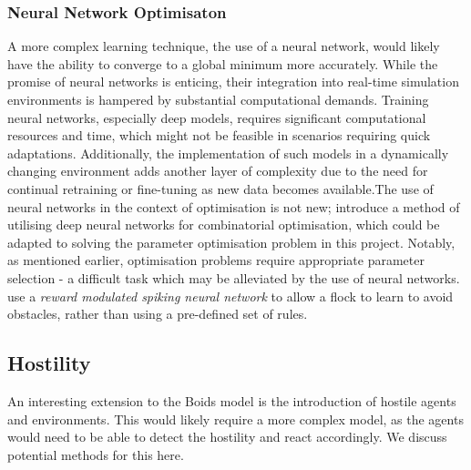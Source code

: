 \documentclass[12pt]{article}
\begin{document}
\subsubsection{Neural Network Optimisaton}
A more complex learning technique, the use of a neural network, would likely have the ability to converge to a global minimum more accurately. While the promise of neural networks is enticing, their integration into real-time simulation environments is hampered by substantial computational demands. Training neural networks, especially deep models, requires significant computational resources and time, which might not be feasible in scenarios requiring quick adaptations. Additionally, the implementation of such models in a dynamically changing environment adds another layer of complexity due to the need for continual retraining or fine-tuning as new data becomes available.The use of neural networks in the context of optimisation is not new; \citet{Caldwell} introduce a method of utilising deep neural networks for combinatorial optimisation, which could be adapted to solving the parameter optimisation problem in this project. Notably, as mentioned earlier, optimisation problems require appropriate parameter selection - a difficult task which may be alleviated by the use of neural networks. \citet{zhao2022nature} use a \emph{reward modulated spiking neural network} to allow a flock to learn to avoid obstacles, rather than using a pre-defined set of rules.

\subsection{Hostility}
An interesting extension to the Boids model is the introduction of hostile agents and environments. This would likely require a more complex model, as the agents would need to be able to detect the hostility and react accordingly. We discuss potential methods for this here.
\end{document}
